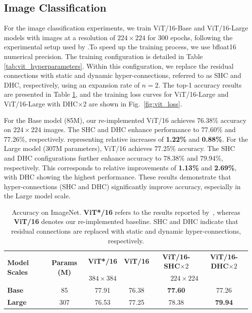 \subsection{Image Classification}
For the image classification experiments, we train ViT/16-Base and ViT/16-Large models with images at a resolution of $224 \times 224$ for 300 epochs, following the experimental setup used by \citep{dosovitskiy2020image}.To speed up the training process, we use bfloat16 numerical precision. The training configuration is detailed in Table \ref{tab:vit_hyperparameters}. Within this configuration, we replace the residual connections with static and dynamic hyper-connections, referred to as SHC and DHC, respectively, using an expansion rate of $n=2$. The top-1 accuracy results are presented in Table \ref{tab:vit_comparison}, and the training loss curves for ViT/16-Large and ViT/16-Large with DHC$\times$2 are shown in Fig.~\ref{fig:vit_loss}.

For the Base model (85M), our re-implemented ViT/16 achieves 76.38\% accuracy on $224 \times 224$ images. The SHC and DHC enhance performance to 77.60\% and 77.26\%, respectively. representing relative increases of \textbf{1.22\%} and \textbf{0.88\%}. For the Large model (307M parameters), ViT/16 achieves 77.25\% accuracy. The SHC and DHC configurations further enhance accuracy to 78.38\% and 79.94\%, respectively. This corresponds to relative improvements of \textbf{1.13\%} and \textbf{2.69\%}, with DHC showing the highest performance. These results demonstrate that hyper-connections (SHC and DHC) significantly improve accuracy, especially in the Large model scale.

\begin{table}[h]
    \centering
    \caption{Accuracy on ImageNet. \textbf{ViT*/16} refers to the results reported by~\citep{dosovitskiy2020image}, whereas \textbf{ViT/16} denotes our re-implemented baseline. SHC and DHC indicate that residual connections are replaced with static and dynamic hyper-connections, respectively.}
    \renewcommand{\arraystretch}{1.2}
    \begin{tabular}{lccccc}
        \toprule
        \multirow{2}{*}{\textbf{Model Scales}} 
        & \multirow{2}{*}{\textbf{Params (M)}}
        & \cellcolor{gray!20} \textbf{ViT*/16}
        & \textbf{ViT/16}
        & \textbf{ViT/16-SHC$\times 2$}
        & \textbf{ViT/16-DHC$\times 2$} \\
        \cmidrule(lr){3-3} \cmidrule(lr){4-6}
        & 
        & \cellcolor{gray!20} \textbf{$384 \times 384$}
        & \multicolumn{3}{c}{\textbf{$224 \times 224$}} \\
        \hline
        \textbf{Base} & 85 & \cellcolor{gray!20} 77.91 & 76.38 & \textbf{77.60} & 77.26 \\
        \hline
        \textbf{Large} & 307 & \cellcolor{gray!20} 76.53 & 77.25 & 78.38 & \textbf{79.94} \\
        \bottomrule
    \end{tabular}
    \label{tab:vit_comparison}
\end{table}

